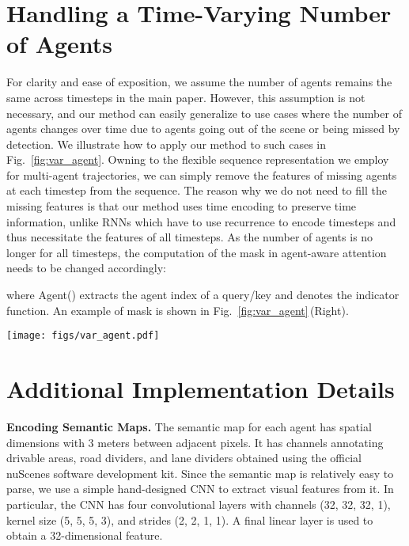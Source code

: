 \documentclass[10pt,twocolumn,letterpaper]{article}
\begin{document}
{\small


}

\onecolumn
\appendix

\section{Handling a Time-Varying Number of Agents}
For clarity and ease of exposition, we assume the number of agents remains the same across timesteps in the main paper. However, this assumption is not necessary, and our method can easily generalize to use cases where the number of agents changes over time due to agents going out of the scene or being missed by detection. We illustrate how to apply our method to such cases in Fig.~\ref{fig:var_agent}. Owning to the flexible sequence representation we employ for multi-agent trajectories, we can simply remove the features of missing agents at each timestep from the sequence. The reason why we do not need to fill the missing features is that our method uses time encoding to preserve time information, unlike RNNs which have to use recurrence to encode timesteps and thus necessitate the features of all timesteps. As the number of agents is no longer  for all timesteps, the computation of the mask  in agent-aware attention needs to be changed accordingly:

where Agent() extracts the agent index of a query/key and  denotes the indicator function. An example of mask  is shown in Fig.~\ref{fig:var_agent}\,(Right).

\begin{figure*}[h]
    \centering
    \texttt{[image: figs/var\_agent.pdf]}
    \caption{Our method can naturally handle a time-varying number of agents because of the flexible sequence representation of multi-agent trajectories. We can simply remove the trajectory features of missing agents at each timestep from the sequence. The mask  of the example sequence (when applying self-attention) is computed based on the agreement of agent identity between each query and key.}
    \label{fig:var_agent}
    \vspace{-2mm}
\end{figure*}

\section{Additional Implementation Details}
\label{sec:supp_details}
\noindent\textbf{Encoding Semantic Maps.}
The semantic map  for each agent  has spatial dimensions  with 3 meters between adjacent pixels. It has  channels annotating drivable areas, road dividers, and lane dividers obtained using the official nuScenes software development kit. Since the semantic map is relatively easy to parse, we use a simple hand-designed CNN to extract visual features  from it. In particular, the CNN has four convolutional layers with channels (32, 32, 32, 1), kernel size (5, 5, 5, 3), and strides (2, 2, 1, 1). A final linear layer is used to obtain a 32-dimensional feature.
\end{document}
